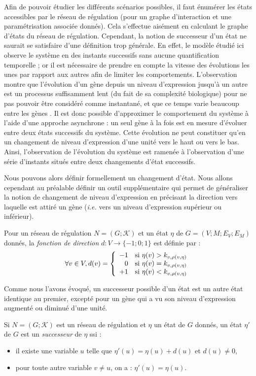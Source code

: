Afin de pouvoir étudier les différents scénarios possibles, il faut énumérer les états accessibles par le réseau de régulation (pour un graphe d'interaction et une paramétrisation associée donnés). Cela s'effectue aisément en calculant le graphe d'états du réseau de régulation. Cependant, la notion de successeur d'un état ne saurait se satisfaire d'une définition trop générale. En effet, le modèle étudié ici observe le système en des instants successifs sans aucune quantification temporelle ; or il est nécessaire de prendre en compte la vitesse des évolutions les unes par rapport aux autres afin de limiter les comportements. L'observation montre que l'évolution d'un gène depuis un niveau d'expression jusqu'à un autre est un processus suffisamment lent (du fait de sa complexité biologique) pour ne pas pouvoir être considéré comme instantané, et que ce temps varie beaucoup entre les gènes \cite{richard-comet-bernot-08}. Il est donc possible d'approximer le comportement du système à l'aide d'une approche asynchrone : un seul gène à la fois est en mesure d'évoluer entre deux états successifs du système. Cette évolution ne peut constituer qu'en un changement de niveau d'expression d'une unité vers le haut ou vers le bas. Ainsi, l'observation de l'évolution du système est ramenée à l'observation d'une série d'instants situés entre deux changements d'état successifs.

Nous pouvons alors définir formellement un changement d'état. Nous allons cependant au préalable définir un outil supplémentaire qui permet de généraliser la notion de changement de niveau d'expression en précisant la direction vers laquelle est attiré un gène (\textit{i.e.} vers un niveau d'expression supérieur ou inférieur).
\begin{definition}
Pour un réseau de régulation $N = (G ; \mathcal{K})$ et un état $\eta$ de $G = (V ; M ; E_V ; E_M)$ donnés, la \emph{fonction de direction} $d : V \rightarrow \{-1 ; 0 ; 1\}$ est définie par :
$$\forall v \in V, d(v) = 
\left\{\begin{array}{r l}
-1 & \text{si}\ \eta(v) > k_{v, \rho(v, \eta)}\\
0 & \text{si}\ \eta(v) = k_{v, \rho(v, \eta)}\\
+1 & \text{si}\ \eta(v) < k_{v, \rho(v, \eta)}
\end{array}\right.$$
\end{definition}

Comme nous l'avons évoqué, un successeur possible d'un état est un autre état identique au premier, excepté pour un gène qui a vu son niveau d'expression augmenté ou diminué d'une unité.
\begin{definition}
Si $N = (G ; \mathcal{K})$ est un réseau de régulation et $\eta$ un état de $G$ donnés, un état $\eta'$ de $G$ est un \emph{successeur} de $\eta$ ssi :
\begin{itemize}
  \item il existe une variable $u$ telle que $\eta'(u) = \eta(u) + d(u)$ et $d(u) \neq 0$,
  \item pour toute autre variable  $v \neq u$, on a : $\eta'(u) = \eta(u)$.
\end{itemize}
\end{definition}

